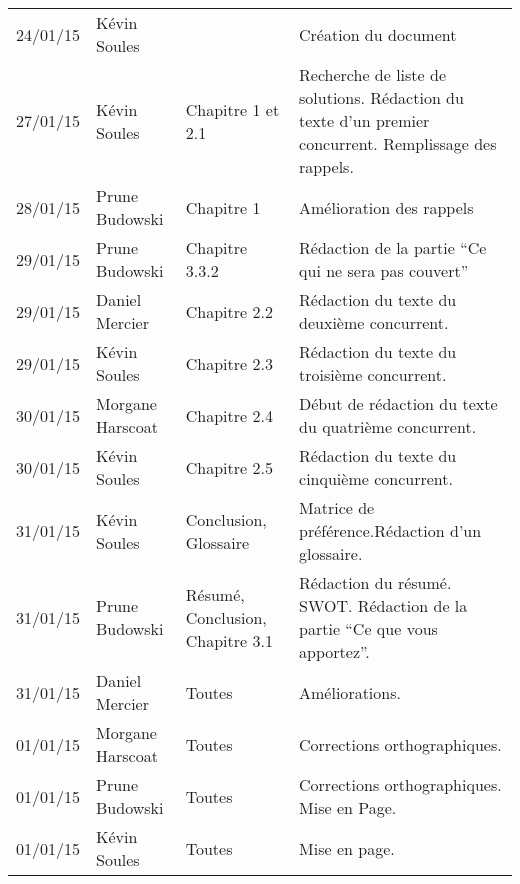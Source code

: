 \small
\begin{tabular}{|p{1.5cm}| >{\raggedright}p{2.5cm}|p{2.5cm}|p{8.5cm}|}
  \hline
 
 \rowcolor{Gainsboro} \color{Navy}{\bfseries Date}  & \color{Navy}{\bfseries Auteur} & \color{Navy}{\bfseries Section(s)}  &\color{Navy}{\bfseries Commentaires} \\
  \hline
24/01/15 & Kévin Soules &  & Création du document\\
  \hline
27/01/15 & Kévin Soules & Chapitre 1 et 2.1 & Recherche de liste de solutions. Rédaction du texte d'un premier concurrent. Remplissage des rappels.\\
\hline
28/01/15 & Prune Budowski & Chapitre 1 & Amélioration des rappels \\
\hline
29/01/15 & Prune Budowski & Chapitre 3.3.2 & Rédaction de la partie ``Ce qui ne sera pas couvert''\\
\hline
29/01/15 & Daniel Mercier & Chapitre 2.2 & Rédaction du texte du deuxième concurrent.\\
\hline
29/01/15 & Kévin Soules & Chapitre 2.3 & Rédaction du texte du troisième concurrent. \\
\hline
30/01/15 & Morgane Harscoat & Chapitre 2.4 & Début de rédaction du texte du quatrième concurrent. \\
\hline
30/01/15 & Kévin Soules & Chapitre 2.5 & Rédaction du texte du cinquième concurrent.\\
\hline
31/01/15 & Kévin Soules & Conclusion, Glossaire & Matrice de préférence.Rédaction d'un glossaire. \\
\hline
31/01/15 & Prune Budowski & Résumé, Conclusion, Chapitre 3.1 & Rédaction du résumé. SWOT. Rédaction de la partie ``Ce que vous apportez''.  
  \\
\hline
31/01/15 & Daniel Mercier & Toutes & Améliorations.
\\
\hline
01/01/15 & Morgane Harscoat & Toutes & Corrections orthographiques.
\\
\hline
01/01/15 & Prune Budowski & Toutes & Corrections orthographiques. Mise en Page.
\\
\hline 
01/01/15 & Kévin Soules & Toutes & Mise en page.
\\
  \hline
\end{tabular}
\normalsize
